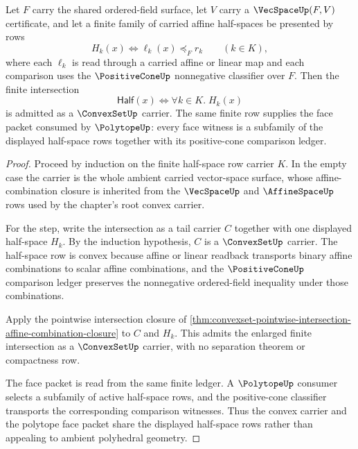 \begin{theorem}
\label{thm:convexset-finite-halfspace-intersection-carrier}
Let $F$ carry the shared ordered-field surface, let $V$ carry a $\VecSpaceUp(F,V)$ certificate, and let a finite family of carried affine half-spaces be presented by rows
$$
H_k(x)\Longleftrightarrow \ell_k(x)\preceq_F r_k
\qquad (k\in K),
$$
where each $\ell_k$ is read through a carried affine or linear map and each comparison uses the $\PositiveConeUp$ nonnegative classifier over $F$. Then the finite intersection
$$
\mathsf{Half}(x)\Longleftrightarrow \forall k\in K.\;H_k(x)
$$
is admitted as a $\ConvexSetUp$ carrier. The same finite row supplies the face packet consumed by $\PolytopeUp$: every face witness is a subfamily of the displayed half-space rows together with its positive-cone comparison ledger.
\end{theorem}
\begin{proof}
Proceed by induction on the finite half-space row carrier $K$. In the empty case the carrier is the whole ambient carried vector-space surface, whose affine-combination closure is inherited from the $\VecSpaceUp$ and $\AffineSpaceUp$ rows used by the chapter's root convex carrier.

For the step, write the intersection as a tail carrier $C$ together with one displayed half-space $H_k$. By the induction hypothesis, $C$ is a $\ConvexSetUp$ carrier. The half-space row is convex because affine or linear readback transports binary affine combinations to scalar affine combinations, and the $\PositiveConeUp$ comparison ledger preserves the nonnegative ordered-field inequality under those combinations.

Apply the pointwise intersection closure of \autoref{thm:convexset-pointwise-intersection-affine-combination-closure} to $C$ and $H_k$. This admits the enlarged finite intersection as a $\ConvexSetUp$ carrier, with no separation theorem or compactness row.

The face packet is read from the same finite ledger. A $\PolytopeUp$ consumer selects a subfamily of active half-space rows, and the positive-cone classifier transports the corresponding comparison witnesses. Thus the convex carrier and the polytope face packet share the displayed half-space rows rather than appealing to ambient polyhedral geometry.
\end{proof}

